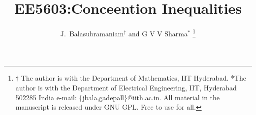\documentclass[journal,12pt,twocolumn]{IEEEtran}
\begin{document}
\let\StandardTheFigure\thefigure
\renewcommand{\thefigure}{\theproblem}



\def\putbox#1#2#3{\makebox[0in][l]{\makebox[#1][l]{}\raisebox{\baselineskip}[0in][0in]{\raisebox{#2}[0in][0in]{#3}}}}
     \def\rightbox#1{\makebox[0in][r]{#1}}
     \def\centbox#1{\makebox[0in]{#1}}
     \def\topbox#1{\raisebox{-\baselineskip}[0in][0in]{#1}}
     \def\midbox#1{\raisebox{-0.5\baselineskip}[0in][0in]{#1}}

\vspace{3cm}

\title{
EE5603:Conceention Inequalities
}


%
%
%

\author{J.~Balasubramaniam$^{\dagger}$ and G V V Sharma$^{*}$ %
\thanks{$\dagger$ The author is with the Department of Mathematics, IIT Hyderabad.  *The author is with the Department
of Electrical Engineering, IIT, Hyderabad
502285 India e-mail: \{jbala,gadepall\}@iith.ac.in. All material in the manuscript is released under GNU GPL.  Free to use for all.}%
}
% 
%
\end{document}
